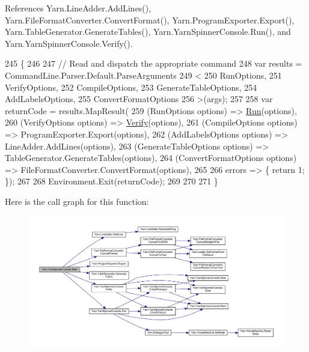 References Yarn.\-Line\-Adder.\-Add\-Lines(), Yarn.\-File\-Format\-Converter.\-Convert\-Format(), Yarn.\-Program\-Exporter.\-Export(), Yarn.\-Table\-Generator.\-Generate\-Tables(), Yarn.\-Yarn\-Spinner\-Console.\-Run(), and Yarn.\-Yarn\-Spinner\-Console.\-Verify().


\begin{DoxyCode}
245         \{
246 
247             \textcolor{comment}{// Read and dispatch the appropriate command}
248             var results = CommandLine.Parser.Default.ParseArguments
249             <
250             RunOptions,
251             VerifyOptions,
252             CompileOptions,
253             GenerateTableOptions,
254             AddLabelsOptions,
255             ConvertFormatOptions
256             >(args);
257 
258             var returnCode = results.MapResult(
259                 (RunOptions options) => \hyperlink{a00195_a1b974c55540795a9e643c2ec055fbd51}{Run}(options),
260                 (VerifyOptions options) => \hyperlink{a00195_a029a5624e7cc3a16ae586b64f13049de}{Verify}(options),
261                 (CompileOptions options) => ProgramExporter.Export(options),
262                 (AddLabelsOptions options) => LineAdder.AddLines(options),
263                 (GenerateTableOptions options) => TableGenerator.GenerateTables(options),
264                 (ConvertFormatOptions options) => FileFormatConverter.ConvertFormat(options),
265 
266                 errors => \{ \textcolor{keywordflow}{return} 1; \});
267 
268             Environment.Exit(returnCode);
269 
270 
271         \}
\end{DoxyCode}


Here is the call graph for this function\-:
\nopagebreak
\begin{figure}[H]
\begin{center}
\leavevmode
\includegraphics[width=350pt]{a00195_a1d71ff2eb190449ea1d42ce86f44489f_cgraph}
\end{center}
\end{figure}



